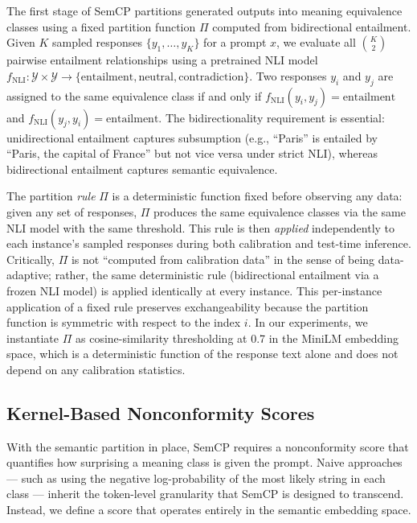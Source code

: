 \documentclass{article}
\begin{document}
The first stage of SemCP partitions generated outputs into meaning equivalence classes using a fixed partition function $\Pi$ computed from bidirectional entailment. Given $K$ sampled responses $\{y_1, \ldots, y_K\}$ for a prompt $x$, we evaluate all $\binom{K}{2}$ pairwise entailment relationships using a pretrained NLI model $f_{\text{NLI}}: \mathcal{Y} \times \mathcal{Y} \rightarrow \{\text{entailment}, \text{neutral}, \text{contradiction}\}$. Two responses $y_i$ and $y_j$ are assigned to the same equivalence class if and only if $f_{\text{NLI}}(y_i, y_j) = \text{entailment}$ and $f_{\text{NLI}}(y_j, y_i) = \text{entailment}$. The bidirectionality requirement is essential: unidirectional entailment captures subsumption (e.g., ``Paris'' is entailed by ``Paris, the capital of France'' but not vice versa under strict NLI), whereas bidirectional entailment captures semantic equivalence.

The partition \emph{rule} $\Pi$ is a deterministic function fixed before observing any data: given any set of responses, $\Pi$ produces the same equivalence classes via the same NLI model with the same threshold. This rule is then \emph{applied} independently to each instance's sampled responses during both calibration and test-time inference. Critically, $\Pi$ is not ``computed from calibration data'' in the sense of being data-adaptive; rather, the same deterministic rule (bidirectional entailment via a frozen NLI model) is applied identically at every instance. This per-instance application of a fixed rule preserves exchangeability because the partition function is symmetric with respect to the index $i$. In our experiments, we instantiate $\Pi$ as cosine-similarity thresholding at 0.7 in the MiniLM embedding space, which is a deterministic function of the response text alone and does not depend on any calibration statistics.

\subsection{Kernel-Based Nonconformity Scores}

\label{sec:kernel_based_nonconformity_scores}

With the semantic partition in place, SemCP requires a nonconformity score that quantifies how surprising a meaning class is given the prompt. Naive approaches --- such as using the negative log-probability of the most likely string in each class --- inherit the token-level granularity that SemCP is designed to transcend. Instead, we define a score that operates entirely in the semantic embedding space.
\end{document}
